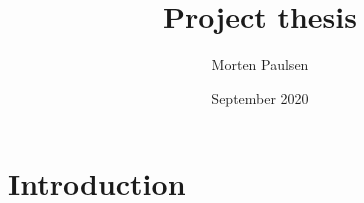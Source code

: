 \documentclass{article}
\title{Project thesis}
\author{Morten Paulsen}
\date{September 2020}
\begin{document}
\maketitle

\section{Introduction}
\end{document}
